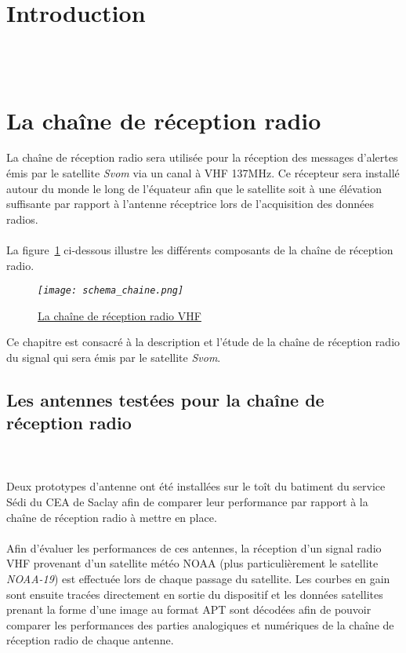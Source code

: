\documentclass[12pt,fleqn]{book} %
\begin{document}

\pagestyle{empty} %

\tableofcontents %



\pagestyle{fancy} %
\setcounter{part}{-1}
\part{Introduction}
\setcounter{chapter}{0}
~\\\\
\part{La chaîne de réception radio}
\setcounter{chapter}{0}
La chaîne de réception radio sera utilisée pour la réception des messages d'alertes émis par le satellite \emph{Svom} via un canal à VHF 137MHz. Ce récepteur sera installé autour du monde le long de l'équateur afin que le satellite soit à une élévation suffisante par rapport à l'antenne réceptrice lors de l'acquisition des données radios.
~\\\\La figure~\underline{\color{blue}\ref{schema_chaine}} ci-dessous illustre les différents composants de la chaîne de réception radio.
\begin{figure}[H]
	\centering
	\itshape
	\texttt{[image: schema\_chaine.png]}
	\caption{\label{schema_chaine} \underline{La chaîne de réception radio VHF}}
\end{figure}
Ce chapitre est consacré à la description et l'étude de la chaîne de réception radio du signal qui sera émis par le satellite \emph{Svom}.

\chapter{Les antennes testées pour la chaîne de réception radio} 
~\\\\Deux prototypes d'antenne ont été installées sur le toît du batiment du service Sédi du CEA de Saclay afin de comparer leur performance par rapport à la chaîne de réception radio à mettre en place.
~\\\\Afin d'évaluer les performances de ces antennes, la réception d'un signal radio VHF provenant d'un satellite météo NOAA (plus particulièrement le satellite \emph{NOAA-19}) est effectuée lors de chaque passage du satellite. Les courbes en gain sont ensuite tracées directement en sortie du dispositif et les données satellites prenant la forme d'une image au format APT sont décodées afin de pouvoir comparer les performances des parties analogiques et numériques de la chaîne de réception radio de chaque antenne.
\end{document}
